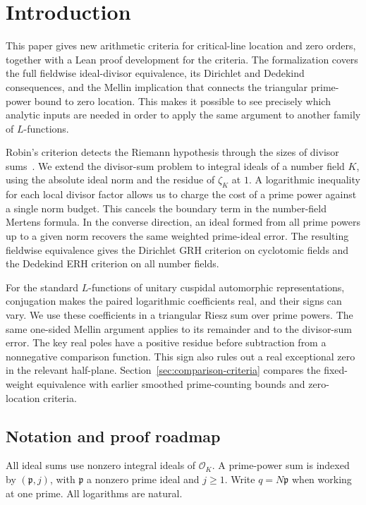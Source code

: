 \documentclass[11pt]{amsart}
\theoremstyle{definition}
\theoremstyle{remark}
\numberwithin{equation}{section}
\begin{document}
\section{Introduction}

This paper gives new arithmetic criteria for critical-line location
and zero orders, together with a Lean proof development for the
criteria. The formalization covers the full fieldwise ideal-divisor
equivalence, its Dirichlet and Dedekind consequences, and the
Mellin implication that connects the triangular prime-power bound
to zero location. This makes it possible to see precisely which
analytic inputs are needed in order to apply the same argument to
another family of \(L\)-functions.

Robin's criterion detects the Riemann hypothesis through the sizes of
divisor sums~\cite{Robin1984}. We extend the divisor-sum problem to
integral ideals of a number field \(K\), using the absolute ideal norm
and the residue of \(\zeta_K\) at \(1\). A logarithmic inequality for
each local divisor factor allows us to charge the cost of a prime
power against a single norm budget. This cancels the boundary term in
the number-field Mertens formula. In the converse direction, an ideal
formed from all prime powers up to a given norm recovers the same
weighted prime-ideal error. The resulting fieldwise equivalence gives
the Dirichlet GRH criterion on cyclotomic fields and the Dedekind ERH
criterion on all number fields.

For the standard \(L\)-functions of unitary cuspidal automorphic
representations, conjugation makes the paired logarithmic coefficients
real, and their signs can vary. We use these coefficients in a
triangular Riesz sum over prime powers. The same one-sided Mellin
argument applies to its remainder and to the divisor-sum error.
The key real poles have a positive residue before subtraction from a
nonnegative comparison function. This sign also rules out a real
exceptional zero in the relevant half-plane.
Section~\ref{sec:comparison-criteria} compares the fixed-weight
equivalence with earlier smoothed prime-counting bounds and
zero-location criteria.

\subsection{Notation and proof roadmap}\label{app:notation}

All ideal sums use nonzero integral ideals of \(\mathcal O_K\). A
prime-power sum is indexed by \((\mathfrak p,j)\), with \(\mathfrak p\)
a nonzero prime ideal and \(j\geq1\). Write \(q=N\mathfrak p\)
when working at one prime. All logarithms are natural.
\end{document}
